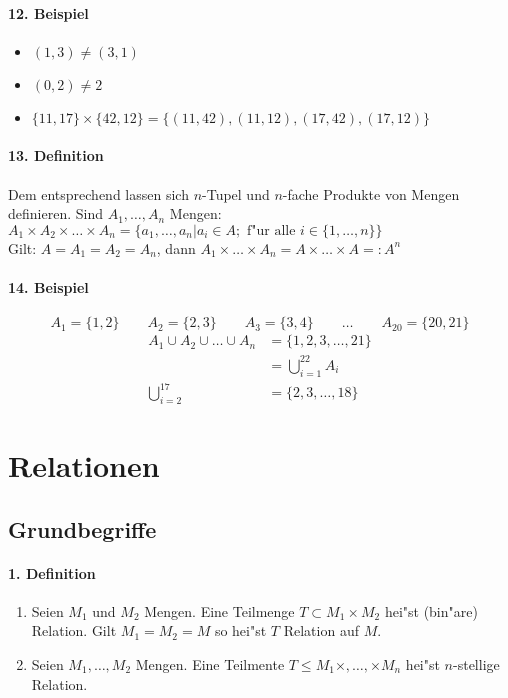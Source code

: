 \paragraph{12. Beispiel}
\begin{itemize}
	\item $(1,3)\neq(3,1)$
	\item $(0,2)\neq2$
	\item $\{11,17\}\times\{42,12\}=\{(11,42), (11,12), (17,42), (17,12)\}$
\end{itemize}

\paragraph{13. Definition} \parskp
Dem entsprechend lassen sich $n$-Tupel und $n$-fache Produkte von Mengen definieren. Sind $A_1,\dots,A_n$ Mengen: $A_1\times A_2\times\dots\times A_n=\{a_1,\dots,a_n|a_i\in A;\text{ f"ur alle }i\in\{1,\dots,n\}\}$\\
Gilt: $A=A_1=A_2=A_n$, dann $A_1\times\dots\times A_n=A\times\dots\times A=:A^n$

\paragraph{14. Beispiel}
\[
A_1=\{1,2\}\qquad A_2=\{2,3\}\qquad A_3=\{3,4\}\qquad \dots\qquad A_20=\{20,21\}
\]
\begin{align*}
	A_1\cup A_2\cup\dots\cup A_n&=\{1,2,3,\dots,21\}\\
	&=\bigcup_{i=1}^{22}A_i\\
	\bigcup_{i=2}^{17}&=\{2,3,\dots,18\}
\end{align*}

\section{Relationen}
\subsection{Grundbegriffe}

\paragraph{1. Definition} \parskp
\begin{enumerate}[label=\alph*)]
    \item Seien $M_1$ und $M_2$ Mengen. Eine Teilmenge $T\subset M_1\times M_2$ hei"st (bin"are) Relation. Gilt $M_1=M_2=M$ so hei"st $T$ Relation auf $M$.
    \item Seien $M_1,\dots,M_2$ Mengen. Eine Teilmente $T\le M_1\times,\dots,\times M_n$ hei"st $n$-stellige Relation.
\end{enumerate}

